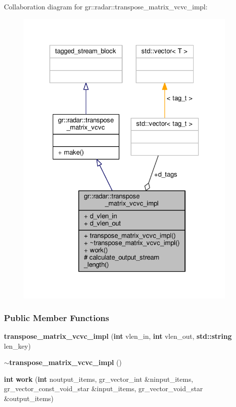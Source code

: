 Collaboration diagram for gr\+:\+:radar\+:\+:transpose\+\_\+matrix\+\_\+vcvc\+\_\+impl\+:
\nopagebreak
\begin{figure}[H]
\begin{center}
\leavevmode
\includegraphics[width=307pt]{d6/d34/classgr_1_1radar_1_1transpose__matrix__vcvc__impl__coll__graph}
\end{center}
\end{figure}
\subsubsection*{Public Member Functions}
\begin{DoxyCompactItemize}
\item 
{\bf transpose\+\_\+matrix\+\_\+vcvc\+\_\+impl} ({\bf int} vlen\+\_\+in, {\bf int} vlen\+\_\+out, {\bf std\+::string} len\+\_\+key)
\item 
{\bf $\sim$transpose\+\_\+matrix\+\_\+vcvc\+\_\+impl} ()
\item 
{\bf int} {\bf work} ({\bf int} noutput\+\_\+items, gr\+\_\+vector\+\_\+int \&ninput\+\_\+items, gr\+\_\+vector\+\_\+const\+\_\+void\+\_\+star \&input\+\_\+items, gr\+\_\+vector\+\_\+void\+\_\+star \&output\+\_\+items)
\end{DoxyCompactItemize}
